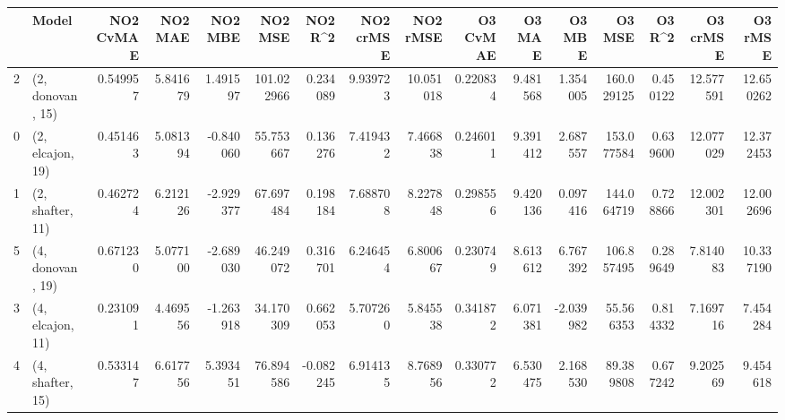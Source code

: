 \begin{tabular}{llrrrrrrrrrrrrrr}
\toprule
{} &             Model &  NO2 CvMAE &   NO2 MAE &   NO2 MBE &     NO2 MSE &   NO2 R\textasciicircum2 &  NO2 crMSE &   NO2 rMSE &  O3 CvMAE &    O3 MAE &    O3 MBE &      O3 MSE &    O3 R\textasciicircum2 &   O3 crMSE &    O3 rMSE \\
\midrule
2 &  (2, donovan, 15) &   0.549957 &  5.841679 &  1.491597 &  101.022966 &  0.234089 &   9.939723 &  10.051018 &  0.220834 &  9.481568 &  1.354005 &  160.029125 &  0.450122 &  12.577591 &  12.650262 \\
0 &  (2, elcajon, 19) &   0.451463 &  5.081394 & -0.840060 &   55.753667 &  0.136276 &   7.419432 &   7.466838 &  0.246011 &  9.391412 &  2.687557 &  153.077584 &  0.639600 &  12.077029 &  12.372453 \\
1 &  (2, shafter, 11) &   0.462724 &  6.212126 & -2.929377 &   67.697484 &  0.198184 &   7.688708 &   8.227848 &  0.298556 &  9.420136 &  0.097416 &  144.064719 &  0.728866 &  12.002301 &  12.002696 \\
5 &  (4, donovan, 19) &   0.671230 &  5.077100 & -2.689030 &   46.249072 &  0.316701 &   6.246454 &   6.800667 &  0.230749 &  8.613612 &  6.767392 &  106.857495 &  0.289649 &   7.814083 &  10.337190 \\
3 &  (4, elcajon, 11) &   0.231091 &  4.469556 & -1.263918 &   34.170309 &  0.662053 &   5.707260 &   5.845538 &  0.341872 &  6.071381 & -2.039982 &   55.566353 &  0.814332 &   7.169716 &   7.454284 \\
4 &  (4, shafter, 15) &   0.533147 &  6.617756 &  5.393451 &   76.894586 & -0.082245 &   6.914135 &   8.768956 &  0.330772 &  6.530475 &  2.168530 &   89.389808 &  0.677242 &   9.202569 &   9.454618 \\
\bottomrule
\end{tabular}
